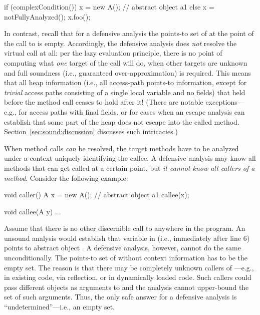 \begin{javaBox}
if (complexCondition())
    x = new A();  // abstract object a1
else
    x = notFullyAnalyzed();
x.foo();
\end{javaBox}

In contrast, recall that for a defensive analysis the points-to set of  at the point of the call to  is empty. Accordingly, the defensive analysis does \emph{not} resolve the virtual call at all: per the lazy evaluation principle, there is no point of computing what \emph{one} target of the call will do, when other targets are unknown and full soundness (i.e., guaranteed over-approximation) is required. This means that all heap information (i.e., all access-path points-to information, except for \emph{trivial} access paths consisting of a single local variable and no fields) that held before the method call ceases to hold after it! (There are notable exceptions---e.g., for access paths with final fields, or for cases when an escape analysis can establish that some part of the heap does not escape into the called method. Section~\ref{sec:sound:discussion} discusses such intricacies.)

When method calls \emph{can} be resolved, the target methods have to be analyzed under a context uniquely identifying the callee. A defensive analysis may know all methods that can get called at a certain point, but \emph{it cannot know all callers of a method}. Consider the following example:

\begin{javaBoxLn}
void caller() { 
    A x = new A(); // abstract object a1
    callee(x);
}

void callee(A y) {
    ...
}
\end{javaBoxLn}

Assume that there is no other discernible call to  anywhere in the program. An unsound analysis would establish that variable  in  (i.e., immediately after line 6) points to abstract object . A defensive analysis, however, cannot do the same unconditionally. The points-to set of  without context information has to be the empty set. The reason is that there may be completely unknown callers of ---e.g., in existing code, via reflection, or in dynamically loaded code. Such callers could pass different objects as arguments to  and the analysis cannot upper-bound the set of such arguments. Thus, the only safe answer for a defensive analysis is ``undetermined''---i.e., an empty set.

